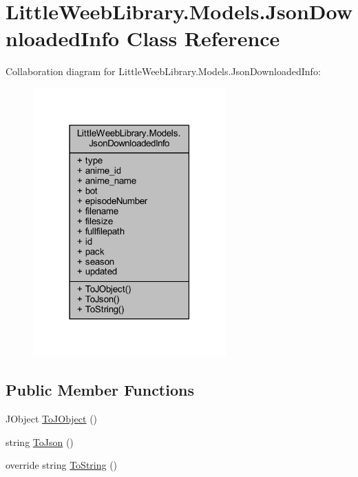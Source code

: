 \hypertarget{class_little_weeb_library_1_1_models_1_1_json_downloaded_info}{}\section{Little\+Weeb\+Library.\+Models.\+Json\+Downloaded\+Info Class Reference}
\label{class_little_weeb_library_1_1_models_1_1_json_downloaded_info}


Collaboration diagram for Little\+Weeb\+Library.\+Models.\+Json\+Downloaded\+Info\+:\nopagebreak
\begin{figure}[H]
\begin{center}
\leavevmode
\includegraphics[width=210pt]{class_little_weeb_library_1_1_models_1_1_json_downloaded_info__coll__graph}
\end{center}
\end{figure}
\subsection*{Public Member Functions}
\begin{DoxyCompactItemize}
\item 
J\+Object \mbox{\hyperlink{class_little_weeb_library_1_1_models_1_1_json_downloaded_info_a9d0248a04fbe0fcc8b6c393ef7f6680e}{To\+J\+Object}} ()
\item 
string \mbox{\hyperlink{class_little_weeb_library_1_1_models_1_1_json_downloaded_info_ad96946eb69871859ec8e765663e8b151}{To\+Json}} ()
\item 
override string \mbox{\hyperlink{class_little_weeb_library_1_1_models_1_1_json_downloaded_info_a1ffa120527f102b7bf96a4c0a2d9e298}{To\+String}} ()
\end{DoxyCompactItemize}
